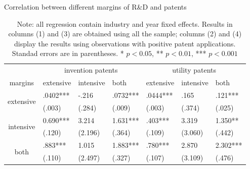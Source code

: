 \documentclass[11pt]{article}
\begin{document}
\begin{table}[h]
\centering
\caption{Correlation between different margins of R\&D and patents}
\label{T4}
\begin{tabular}{cllllll}
\toprule
 & \multicolumn{3}{c}{invention patents} & \multicolumn{3}{c}{utility patents} \\
 margins& extensive   & intensive  & both       & extensive  & intensive  & both      \\
                                          \hline 
\multirow{2}{*}{extensive} & .0402***   & -.216     & .0732***  & .0444***  & .165      & .121***  \\
                                          & (.003)     & (.284)    & (.009)    & (.003)    & (.374)    & (.025)   \\
                                          \hline
\multirow{2}{*}{intensive} & 0.690***    & 3.214      & 1.631***   & .403***   & 3.319      & 1.350**   \\
                                          & (.120)     & (2.196)    & (.364)    & (.109)    & (3.060)    & (.442)   \\
 \hline
\multirow{2}{*}{both}                     & .883***   & 1.015      & 1.883***   & .780***  & 2.870      & 2.302***  \\
                                          & (.110)     & (2.497)    & (.327)    & (.107)    & (3.109)    & (.476)  \\ \bottomrule
\end{tabular}
\caption*{\small{}Note: all regression contain industry and year fixed effects. Results in columns (1) and (3) are obtained using all the sample; columns (2) and (4) display the results using observations with positive patent applications. Standad errors are in parentheses. * \(p<0.05\), ** \(p<0.01\), *** \(p<0.001\)} {\small \par}
\end{table}
\end{document}
